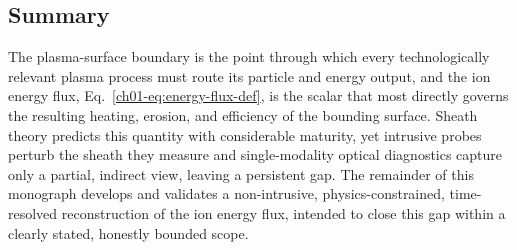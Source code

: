 \subsection*{Summary}

The plasma-surface boundary is the point through which every technologically relevant plasma process must route its particle and energy output, and the ion energy flux, Eq.~\eqref{ch01-eq:energy-flux-def}, is the scalar that most directly governs the resulting heating, erosion, and efficiency of the bounding surface. Sheath theory predicts this quantity with considerable maturity, yet intrusive probes perturb the sheath they measure and single-modality optical diagnostics capture only a partial, indirect view, leaving a persistent gap. The remainder of this monograph develops and validates a non-intrusive, physics-constrained, time-resolved reconstruction of the ion energy flux, intended to close this gap within a clearly stated, honestly bounded scope.

